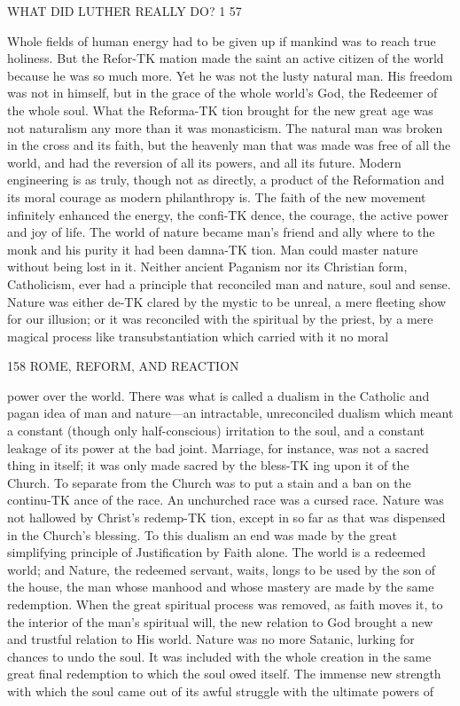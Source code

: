 \documentclass[12pt,a5paper,twoside]{book}
\begin{document}
{WHAT DID LUTHER REALLY DO? 1 57 

Whole fields of human energy had to be given up if 
mankind was to reach true holiness. But the Refor-TK
mation made the saint an active citizen of the world 
because he was so much more. Yet he was not the 
lusty natural man. His freedom was not in himself, 
but in the grace of the whole world's God, the 
Redeemer of the whole soul. What the Reforma-TK
tion brought for the new great age was not naturalism 
any more than it was monasticism. The natural man 
was broken in the cross and its faith, but the heavenly 
man that was made was free of all the world, and had 
the reversion of all its powers, and all its future. 
Modern engineering is as truly, though not as directly, 
a product of the Reformation and its moral courage 
as modern philanthropy is. The faith of the new 
movement infinitely enhanced the energy, the confi-TK
dence, the courage, the active power and joy of life. 
The world of nature became man's friend and ally 
where to the monk and his purity it had been damna-TK
tion. Man could master nature without being lost in 
it. Neither ancient Paganism nor its Christian form, 
Catholicism, ever had a principle that reconciled man 
and nature, soul and sense. Nature was either de-TK
clared by the mystic to be unreal, a mere fleeting 
show for our illusion; or it was reconciled with the 
spiritual by the priest, by a mere magical process like 
transubstantiation which carried with it no moral 



158 ROME, REFORM, AND REACTION 

power over the world. There was what is called a 
dualism in the Catholic and pagan idea of man and 
nature---an intractable, unreconciled dualism which 
meant a constant (though only half-conscious) irritation 
to the soul, and a constant leakage of its power at the 
bad joint. Marriage, for instance, was not a sacred 
thing in itself; it was only made sacred by the bless-TK
ing upon it of the Church. To separate from the 
Church was to put a stain and a ban on the continu-TK
ance of the race. An unchurched race was a cursed 
race. Nature was not hallowed by Christ's redemp-TK
tion, except in so far as that was dispensed in the 
Church's blessing. To this dualism an end was made 
by the great simplifying principle of Justification by 
Faith alone. The world is a redeemed world; and 
Nature, the redeemed servant, waits, longs to be used 
by the son of the house, the man whose manhood 
and whose mastery are made by the same redemption. 
When the great spiritual process was removed, as 
faith moves it, to the interior of the man's spiritual 
will, the new relation to God brought a new and 
trustful relation to His world. Nature was no more 
Satanic, lurking for chances to undo the soul. It was 
included with the whole creation in the same great 
final redemption to which the soul owed itself. The 
immense new strength with which the soul came out 
of its awful struggle with the ultimate powers of 



}
\end{document}
